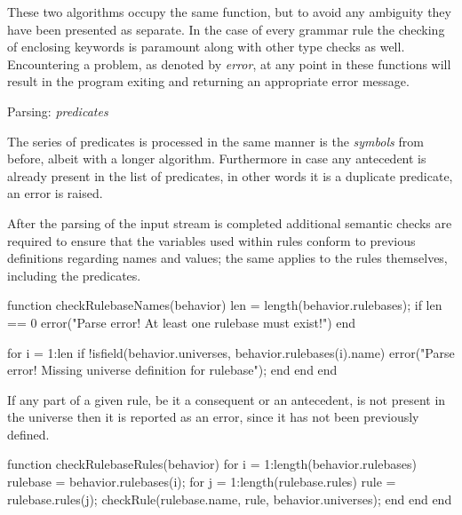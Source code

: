 These two algorithms occupy the same function, but to avoid any ambiguity they have been presented as separate. In the case of every grammar rule the checking of enclosing keywords is paramount along with other type checks as well. Encountering a problem, as denoted by \textit{error},  at any point in these functions will result in the program exiting and returning an appropriate error message.

\begin{algorithm}[H]
\caption{Parsing: \textit{predicates}}
\end{algorithm}

The series of predicates is processed in the same manner is the \textit{symbols} from before, albeit with a longer algorithm. Furthermore in case any antecedent is already present in the list of predicates, in other words it is a duplicate predicate, an error is raised.

After the parsing of the input stream is completed additional semantic checks are required to ensure that the variables used within rules conform to previous definitions regarding names and values; the same applies to the rules themselves, including the predicates.

\begin{octave}
function checkRulebaseNames(behavior)
  len = length(behavior.rulebases);
  if len == 0
    error("Parse error! At least one rulebase must exist!\n")
  end

  for i = 1:len
    if !isfield(behavior.universes, behavior.rulebases(i).name)
      error("Parse error! Missing universe definition for rulebase\n");
    end
  end
end
\end{octave}

If any part of a given rule, be it a consequent or an antecedent, is not present in the universe then it is reported as an error, since it has not been previously defined.
\begin{octave}
function checkRulebaseRules(behavior)
  for i = 1:length(behavior.rulebases)
    rulebase = behavior.rulebases(i);
    for j = 1:length(rulebase.rules)
      rule = rulebase.rules(j);
      checkRule(rulebase.name, rule, behavior.universes);
    end
  end
end
\end{octave}

